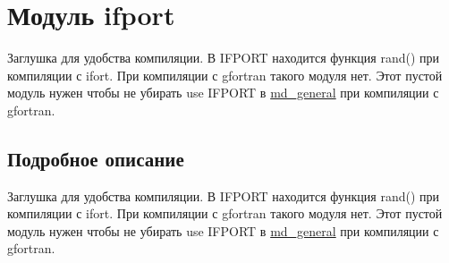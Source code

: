 \hypertarget{namespaceifport}{}\section{Модуль ifport}
\label{namespaceifport}


Заглушка для удобства компиляции.  В I\+F\+P\+O\+RT находится функция rand() при компиляции с ifort. При компиляции с gfortran такого модуля нет. Этот пустой модуль нужен чтобы не убирать use I\+F\+P\+O\+RT в \mbox{\hyperlink{namespacemd__general}{md\+\_\+general}} при компиляции с gfortran.  




\subsection{Подробное описание}
Заглушка для удобства компиляции.  В I\+F\+P\+O\+RT находится функция rand() при компиляции с ifort. При компиляции с gfortran такого модуля нет. Этот пустой модуль нужен чтобы не убирать use I\+F\+P\+O\+RT в \mbox{\hyperlink{namespacemd__general}{md\+\_\+general}} при компиляции с gfortran. 